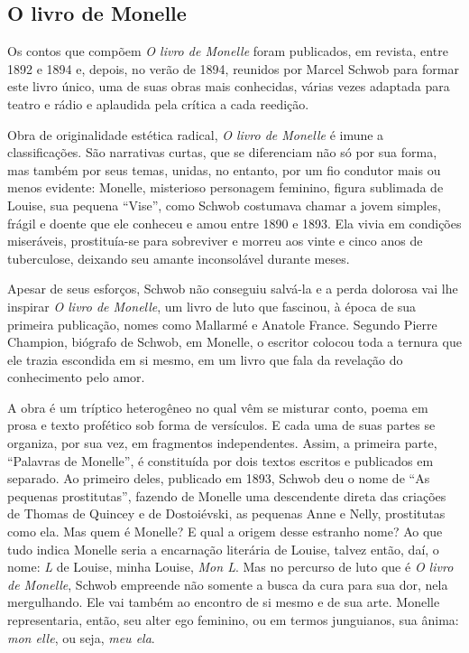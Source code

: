 \subsection{O livro de Monelle}

Os contos que compõem \textit{O livro de Monelle} foram publicados,
em revista, entre 1892 e 1894 e, depois, no verão de 1894, reunidos por Marcel
Schwob para formar este livro único, uma de suas obras mais conhecidas, várias
vezes adaptada para teatro e rádio e aplaudida pela crítica a cada reedição.

Obra de originalidade estética radical, \textit{O livro de Monelle} é imune
a classificações. São narrativas curtas, que se diferenciam não só por sua
forma, mas também por seus temas, unidas, no entanto, por um fio condutor
mais ou menos evidente: Monelle, misterioso personagem feminino, figura
sublimada de Louise, sua pequena “Vise”, como Schwob costumava chamar a
jovem simples, frágil e doente que ele conheceu e amou entre 1890 e 1893. Ela
vivia em condições miseráveis, prostituía-se para sobreviver e morreu aos vinte
e cinco anos de tuberculose, deixando seu amante inconsolável durante meses.

Apesar de seus esforços, Schwob não conseguiu salvá-la e a perda dolorosa
vai lhe inspirar \textit{O livro de Monelle}, um livro de luto que fascinou, à
época de sua primeira publicação, nomes como Mallarmé e Anatole France.
Segundo Pierre Champion, biógrafo de Schwob, em Monelle, o escritor colocou
toda a ternura que ele trazia escondida em si mesmo, em um livro que fala da
revelação do conhecimento pelo amor.

A obra é um tríptico heterogêneo no qual vêm se misturar conto, poema em
prosa e texto profético sob forma de versículos. E cada uma de suas partes se
organiza, por sua vez, em fragmentos independentes. Assim, a primeira parte,
``Palavras de Monelle'', é constituída por dois textos escritos e
publicados em separado. Ao primeiro deles, publicado em 1893, Schwob deu o nome
de ``As pequenas prostitutas'', fazendo de Monelle uma descendente direta
das criações de Thomas de Quincey e de Dostoiévski, as pequenas Anne e Nelly,
prostitutas como ela. Mas quem é Monelle? E qual a origem desse estranho nome?
Ao que tudo indica Monelle seria a encarnação literária de Louise, talvez então, daí,
o nome: \textit{L} de Louise, minha Louise, \textit{Mon L}. Mas no percurso de luto
que é \textit{O livro de Monelle}, Schwob empreende não somente a busca da cura para
sua dor, nela mergulhando. Ele vai também ao encontro de si mesmo e de sua arte.
Monelle representaria, então, seu alter ego feminino, ou em termos junguianos,
sua ânima: \textit{mon elle}, ou seja, \textit{meu ela}.

